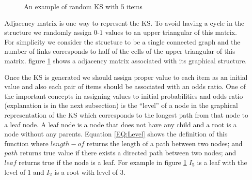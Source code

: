 \begin{figure}[t]
\centering 
{}
\qquad
\qquad
{}

\caption{An example of random KS with 5 items}
\label{fig:KSExample}
\end{figure}

Adjacency matrix  is one way to represent the KS. To avoid having a cycle in the structure we randomly assign $0$-$1$ values to an upper triangular of this matrix. For simplicity we consider the structure to be a single connected graph and the number of links corresponds to half of the cells of the upper triangular of this matrix. figure \ref{fig:KSExample} shows a adjacency matrix associated with its graphical structure. 

Once the KS is generated we should assign proper value to each item as an initial value and also each pair of items should be associated with an odds ratio. One of the important concepts in assigning values to initial probabilities and odds ratio (explanation is in the next subsection) is the ``level'' of a node in the graphical representation of the KS which corresponds to the longest path from that node to a leaf node. A leaf node is a node that does not have any child and a root is a node without any parents. Equation \ref{EQ:Level} shows the definition of this function where $length-of$ returns the length of a path between two nodes; and $path$ returns true value if there exists a directed path between two nodes; and $leaf$ returns true if the node is a leaf.  For example in figure \ref{fig:KSExample} $I_{5}$ is a leaf with the level of $1$ and $I_{2}$ is a root with level of $3$.

